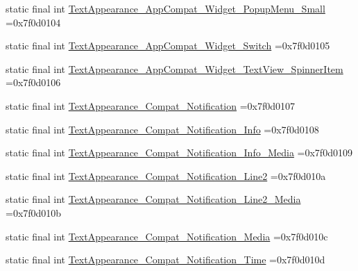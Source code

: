 \begin{DoxyCompactItemize}
\item 
static final int \mbox{\hyperlink{classbr_1_1unb_1_1cic_1_1mp_1_1marketmaster_1_1R_1_1style_a8a462761378c91d3511b804e1e28726c}{Text\+Appearance\+\_\+\+App\+Compat\+\_\+\+Widget\+\_\+\+Popup\+Menu\+\_\+\+Small}} =0x7f0d0104
\item 
static final int \mbox{\hyperlink{classbr_1_1unb_1_1cic_1_1mp_1_1marketmaster_1_1R_1_1style_a6ae3e648e17d545084de7e00dfd71796}{Text\+Appearance\+\_\+\+App\+Compat\+\_\+\+Widget\+\_\+\+Switch}} =0x7f0d0105
\item 
static final int \mbox{\hyperlink{classbr_1_1unb_1_1cic_1_1mp_1_1marketmaster_1_1R_1_1style_aca785c77648d0657620e8ff616cdf4d1}{Text\+Appearance\+\_\+\+App\+Compat\+\_\+\+Widget\+\_\+\+Text\+View\+\_\+\+Spinner\+Item}} =0x7f0d0106
\item 
static final int \mbox{\hyperlink{classbr_1_1unb_1_1cic_1_1mp_1_1marketmaster_1_1R_1_1style_a209216ad307d91de5e7edd04aee6caff}{Text\+Appearance\+\_\+\+Compat\+\_\+\+Notification}} =0x7f0d0107
\item 
static final int \mbox{\hyperlink{classbr_1_1unb_1_1cic_1_1mp_1_1marketmaster_1_1R_1_1style_a47ea8ca2edd832ae42fb9d32374a586c}{Text\+Appearance\+\_\+\+Compat\+\_\+\+Notification\+\_\+\+Info}} =0x7f0d0108
\item 
static final int \mbox{\hyperlink{classbr_1_1unb_1_1cic_1_1mp_1_1marketmaster_1_1R_1_1style_a94038e8fbbd1209398ca031c85c394bf}{Text\+Appearance\+\_\+\+Compat\+\_\+\+Notification\+\_\+\+Info\+\_\+\+Media}} =0x7f0d0109
\item 
static final int \mbox{\hyperlink{classbr_1_1unb_1_1cic_1_1mp_1_1marketmaster_1_1R_1_1style_af8a9c83df9c0d41151491cc832dc3aa9}{Text\+Appearance\+\_\+\+Compat\+\_\+\+Notification\+\_\+\+Line2}} =0x7f0d010a
\item 
static final int \mbox{\hyperlink{classbr_1_1unb_1_1cic_1_1mp_1_1marketmaster_1_1R_1_1style_af5a6ce5f9bd866e098fa4a1e31d89b82}{Text\+Appearance\+\_\+\+Compat\+\_\+\+Notification\+\_\+\+Line2\+\_\+\+Media}} =0x7f0d010b
\item 
static final int \mbox{\hyperlink{classbr_1_1unb_1_1cic_1_1mp_1_1marketmaster_1_1R_1_1style_a622c3351d969804fcfc89c7cb0dcf1ea}{Text\+Appearance\+\_\+\+Compat\+\_\+\+Notification\+\_\+\+Media}} =0x7f0d010c
\item 
static final int \mbox{\hyperlink{classbr_1_1unb_1_1cic_1_1mp_1_1marketmaster_1_1R_1_1style_a3b671f0464addcb8f32aea796c90c6ab}{Text\+Appearance\+\_\+\+Compat\+\_\+\+Notification\+\_\+\+Time}} =0x7f0d010d
\item 

\end{DoxyCompactItemize}
